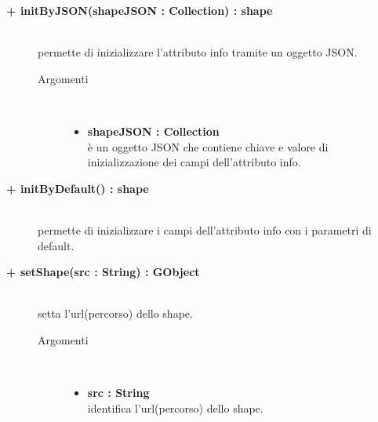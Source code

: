 \begin{description}
\begin{description}
\end{description}

\begin{description}
		\item[\textbf{\color{blue}+ initByJSON(shapeJSON : Collection) : shape			}] \hfill \\
			permette di inizializzare l'attributo info tramite un oggetto JSON. 
			
		\begin{description}
			\item[Argomenti] \hfill \\
				\begin{itemize}
				
					\item \textbf{shapeJSON : Collection			} \hfill \\
					è un oggetto JSON che contiene chiave e valore di inizializzazione dei campi dell'attributo info. 
				\end{itemize}
		\end{description}

\end{description}

\begin{description}
		\item[\textbf{\color{blue}+ initByDefault() : shape			}] \hfill \\
			permette di inizializzare i campi dell'attributo info con i parametri di default. 

\end{description}

\begin{description}
		\item[\textbf{\color{blue}+ setShape(src : String) : GObject			}] \hfill \\
			setta l'url(percorso) dello shape. 
			
		\begin{description}
			\item[Argomenti] \hfill \\
				\begin{itemize}
				
					\item \textbf{src : String			} \hfill \\
					identifica l'url(percorso) dello shape.
				\end{itemize}
		\end{description}


\end{description}
\end{description}
